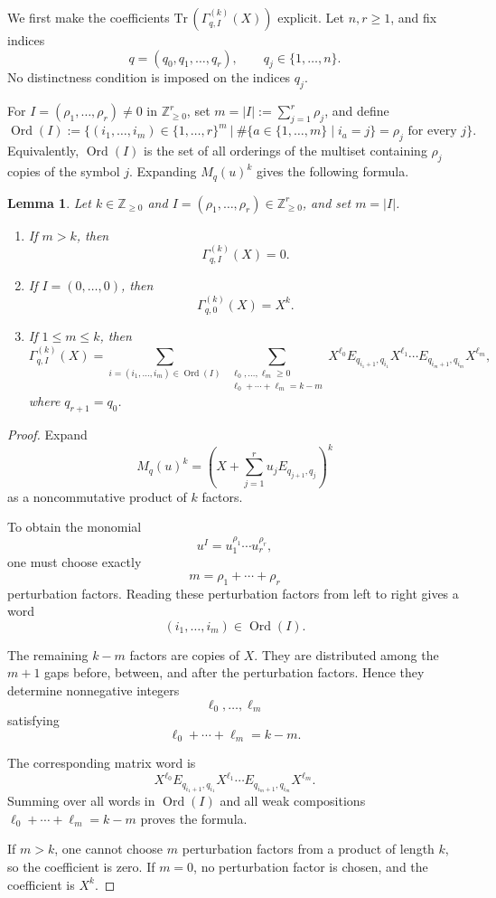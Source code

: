 \documentclass[11pt,reqno]{amsart}
\newtheorem{lemma}[theorem]{Lemma}
\theoremstyle{definition}
\newcommand{\bbZ}{\mathbb{Z}}
\newcommand{\Tr}{\mathrm{Tr} \,}
\newcommand{\Ord}{\operatorname{Ord}}
\begin{document}
We first make the coefficients 
\(\Tr(\Gamma_{q,I}^{(k)}(X))\) explicit.
Let \(n,r\geq 1\), and fix indices
\[
q=(q_0,q_1,\dots,q_r),
\qquad
q_j\in\{1,\dots,n\}.
\]
No distinctness condition is imposed on the 
indices \(q_j\).

For \(I=(\rho_1,\dots,\rho_r)\neq 0\) in \(\mathbb Z_{\geq 0}^{r}\), set
\(m=|I|:=\sum_{j=1}^r\rho_j\), and define
\[
\Ord(I)
:=
\Biggl\{
	(i_1,\dots,i_m)\in\{1,\dots,r\}^m
	\ \bigg\vert\
	\#\{a\in\{1,\dots,m\}\mid i_a=j\}=\rho_j
	\text{ for every }j
\Biggr\}.
\]
Equivalently, \(\Ord(I)\) is the set of all orderings of the multiset
containing \(\rho_j\) copies of the symbol \(j\).
Expanding \(M_q(u)^k\) gives the following formula.

\begin{lemma}
Let \(k\in\bbZ_{\geq0}\) and
\(I=(\rho_1,\ldots,\rho_r)\in\mathbb Z_{\geq 0}^{r}\), and set
\(m=|I|\).
\begin{enumerate}
\item If \(m>k\), then
\[
\Gamma_{q,I}^{(k)}(X)=0.
\]
\item If \(I=(0,\ldots,0)\), then
\[
\Gamma_{q,0}^{(k)}(X)=X^k.
\]
\item If \(1\leq m\leq k\), then
\[
\Gamma_{q,I}^{(k)}(X)
=
\sum_{i=(i_1,\ldots,i_m)\in \Ord (I)}
\ \sum_{\substack{\ell_0,\ldots,\ell_m\geq 0\\
\ell_0+\cdots+\ell_m=k-m}}
X^{\ell_0}
E_{q_{i_1+1},q_{i_1}}
X^{\ell_1}
\cdots
E_{q_{i_m+1},q_{i_m}}
X^{\ell_m},
\]
where \(q_{r+1}=q_0\).
\end{enumerate}
\end{lemma}
\begin{proof}
Expand
\[
M_q(u)^k
=
\left(
	X+\sum_{j=1}^{r}u_jE_{q_{j+1},q_j}
\right)^k
\]
as a noncommutative product of $k$ factors.

To obtain the monomial
\[
u^I=u_1^{\rho_1}\cdots u_r^{\rho_r},
\]
one must choose exactly
\[
m=\rho_1+\cdots+\rho_r
\]
perturbation factors. Reading these perturbation factors from left to
right gives a word
\[
(i_1,\dots,i_m)\in\Ord(I).
\]

The remaining $k-m$ factors are copies of $X$. They are distributed
among the $m+1$ gaps before, between, and after the perturbation
factors. Hence they determine nonnegative integers
\[
\ell_0,\dots,\ell_m
\]
satisfying
\[
\ell_0+\cdots+\ell_m=k-m.
\]

The corresponding matrix word is
\[
	X^{\ell_0}
	E_{q_{i_1+1},q_{i_1}}
	X^{\ell_1}
	\cdots
	E_{q_{i_m+1},q_{i_m}}
	X^{\ell_m}.
\]
Summing over all words in $\Ord(I)$ and all weak compositions
$\ell_0+\cdots+\ell_m=k-m$ proves the formula.

If $m>k$, one cannot choose $m$ perturbation factors from a product of
length $k$, so the coefficient is zero. If $m=0$, no perturbation factor
is chosen, and the coefficient is $X^k$.
\end{proof}
\end{document}

